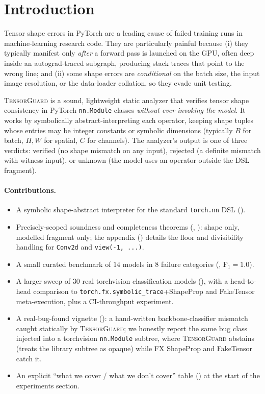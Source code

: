 \documentclass{article}
\theoremstyle{definition}
\begin{document}
\section{Introduction}\label{sec:intro}

Tensor shape errors in PyTorch are a leading cause of failed training
runs in machine-learning research code. They are particularly painful
because (i) they typically manifest only \emph{after} a forward pass is
launched on the GPU, often deep inside an autograd-traced subgraph,
producing stack traces that point to the wrong line; and (ii) some
shape errors are \emph{conditional} on the batch size, the input image
resolution, or the data-loader collation, so they evade unit testing.

\textsc{TensorGuard} is a sound, lightweight static analyzer that
verifies tensor shape consistency in PyTorch \verb|nn.Module| classes
\emph{without ever invoking the model}. It works by symbolically
abstract-interpreting each operator, keeping shape tuples whose entries
may be integer constants or symbolic dimensions (typically
$B$ for batch, $H,W$ for spatial, $C$ for channels). The analyzer's
output is one of three verdicts: \textsf{verified} (no shape mismatch
on any input), \textsf{rejected} (a definite mismatch with witness
input), or \textsf{unknown} (the model uses an operator outside the
DSL fragment).

\paragraph{Contributions.}
\begin{itemize}\itemsep0pt
  \item A symbolic shape-abstract interpreter for the standard
        \verb|torch.nn| DSL ().
  \item Precisely-scoped soundness and completeness theorems
        (, ): shape
        only, modelled fragment only; the appendix
        () details the floor and
        divisibility handling for \verb|Conv2d| and
        \verb|view(-1, ...)|.
  \item A small curated benchmark of $14$ models in $8$ failure
        categories (, F$_1=1.0$).
  \item A larger sweep of $30$ real torchvision classification models
        (), with a head-to-head comparison
        to \verb|torch.fx.symbolic_trace|+ShapeProp and FakeTensor
        meta-execution, plus a CI-throughput experiment.
  \item A real-bug-found vignette (): a
        hand-written backbone-classifier mismatch caught statically by
        \textsc{TensorGuard}; we honestly report the same bug class
        injected into a torchvision \verb|nn.Module| subtree, where
        \textsc{TensorGuard} abstains (treats the library subtree as
        opaque) while FX ShapeProp and FakeTensor catch it.
  \item An explicit ``what we cover / what we don't cover'' table
        () at the start of the experiments section.
\end{itemize}
\end{document}
